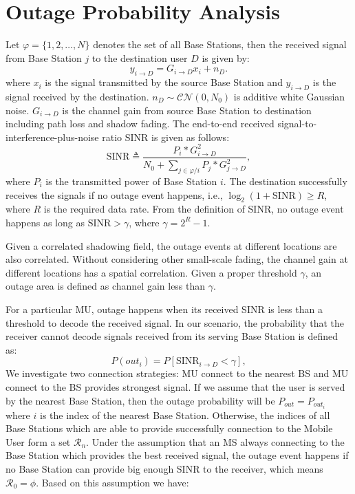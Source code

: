 \section{Outage Probability Analysis}
\par Let $\varphi = \{1, 2, \dots, N\}$ denotes the set of all Base Stations, then the received signal from Base Station $j$ to the destination user $D$ is given by:
\begin{equation}
y_{i\to D} = G_{i\to D}x_{i}+n_{D}.
\end{equation}
where $x_{i}$ is the signal transmitted by the source Base Station and $y_{i\to D}$ is the signal received by the destination. $n_{D}\sim \mathcal{CN}(0,N_{0})$ is additive white Gaussian noise. $G_{i\to D}$ is the channel gain from source Base Station to destination including path loss and shadow fading. The end-to-end received signal-to-interference-plus-noise ratio $\text{SINR}$ is given as follows:
\begin{equation}
\text{SINR} \triangleq \frac{P_{i}*G_{i\to D}^{2}}{N_{0}+\sum_{j\in \varphi/i}P_{j}*G_{j\to D}^2},
\end{equation}
where $P_{i}$ is the transmitted power of Base Station $i$. The destination successfully receives the signals if no outage event happens, i.e., $\log_{2}(1+\text{SINR})\ge R$, where $R$ is the required data rate. From the definition of SINR, no outage event happens as long as $\text{SINR} > \gamma$, where $\gamma = 2^{R}-1$.
\par Given a correlated shadowing field, the outage events at different locations are also correlated. Without considering other small-scale fading, the channel gain at different locations has a spatial correlation. Given a proper threshold $\gamma$, an outage area is defined as channel gain less than $\gamma$. 
\par For a particular MU, outage happens when its received SINR is less than a threshold to decode the received signal. In our scenario, the probability that the receiver cannot decode signals received from its serving Base Station is defined as:
\begin{equation}
P(out_{i}) = P[\text{SINR}_{i\to D} < \gamma],
\end{equation}
We investigate two connection strategies: MU connect to the nearest BS and MU connect to the BS provides strongest signal. If we assume that the user is served by the nearest Base Station, then the outage probability will be $P_{out} = P_{out_{i}}$ where $i$ is the index of the nearest Base Station. Otherwise, the indices of all Base Stations which are able to provide successfully connection to the Mobile User form a set $\mathcal{R}_{n}$. Under the assumption that an MS always connecting to the Base Station which provides the best received signal, the outage event happens if no Base Station can provide big enough SINR to the receiver, which means $\mathcal{R}_{0}=\phi$. Based on this assumption we have:
